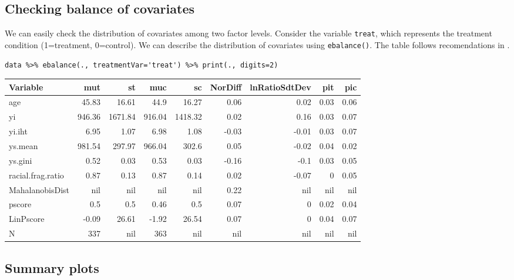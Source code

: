\documentclass[a4paper]{article}
\begin{document}
\subsection{Checking balance of covariates}
\label{sec:org6128e09}

We can easily check the distribution of covariates among two factor levels. Consider the variable \texttt{treat}, which represents the treatment condition (1=treatment, 0=control). We can describe the distribution of covariates using \texttt{ebalance()}. The table follows recomendations in \cite{imbens2015causal}.

\lstset{numbers=left,language=r,label=org341f080,caption= ,captionpos=b}
\begin{lstlisting}
data %>% ebalance(., treatmentVar='treat') %>% print(., digits=2)

\end{lstlisting}

\begin{center}
\begin{tabular}{lrrrrrrrr}
Variable & mut & st & muc & sc & NorDiff & lnRatioSdtDev & pit & pic\\
\hline
age & 45.83 & 16.61 & 44.9 & 16.27 & 0.06 & 0.02 & 0.03 & 0.06\\
yi & 946.36 & 1671.84 & 916.04 & 1418.32 & 0.02 & 0.16 & 0.03 & 0.07\\
yi.iht & 6.95 & 1.07 & 6.98 & 1.08 & -0.03 & -0.01 & 0.03 & 0.07\\
ys.mean & 981.54 & 297.97 & 966.04 & 302.6 & 0.05 & -0.02 & 0.04 & 0.02\\
ys.gini & 0.52 & 0.03 & 0.53 & 0.03 & -0.16 & -0.1 & 0.03 & 0.05\\
racial.frag.ratio & 0.87 & 0.13 & 0.87 & 0.14 & 0.02 & -0.07 & 0 & 0.05\\
MahalanobisDist & nil & nil & nil & nil & 0.22 & nil & nil & nil\\
pscore & 0.5 & 0.5 & 0.46 & 0.5 & 0.07 & 0 & 0.02 & 0.04\\
LinPscore & -0.09 & 26.61 & -1.92 & 26.54 & 0.07 & 0 & 0.04 & 0.07\\
N & 337 & nil & 363 & nil & nil & nil & nil & nil\\
\end{tabular}
\end{center}

\subsection{Summary plots}
\label{sec:org5eb2bec}
\end{document}
